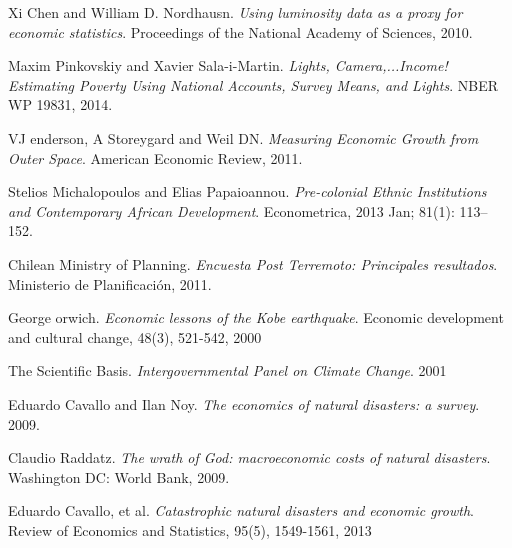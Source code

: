 \documentclass{beamer}
\begin{document}
\begin{thebibliography}{9}
	Xi Chen and William D. Nordhausn. 
	\textit{Using luminosity data as a proxy for economic statistics}. 
	Proceedings of the National Academy of Sciences, 2010.

	Maxim Pinkovskiy and Xavier Sala-i-Martin. 
	\textit{Lights, Camera,...Income! Estimating Poverty Using National Accounts, Survey Means, and Lights}. 
	NBER WP 19831, 2014.

	VJ enderson, A Storeygard and Weil DN. 
	\textit{Measuring Economic Growth from Outer Space}. 
	American Economic Review, 2011.

	Stelios Michalopoulos and Elias Papaioannou. 
	\textit{Pre-colonial Ethnic Institutions and Contemporary African Development}. 
	Econometrica, 2013 Jan; 81(1): 113–152.

	Chilean Ministry of Planning. 
	\textit{Encuesta Post Terremoto: Principales resultados}. 
	Ministerio de Planificación, 2011.
	
	George orwich.
	\textit{Economic lessons of the Kobe earthquake}. 
	Economic development and cultural change, 48(3), 521-542, 2000
	
	The Scientific Basis.
	\textit{Intergovernmental Panel on Climate Change}. 2001	
	
	Eduardo Cavallo and Ilan Noy. 
	\textit{The economics of natural disasters: a survey}. 2009.	
	
	Claudio Raddatz.
	\textit{The wrath of God: macroeconomic costs of natural disasters}. Washington DC: World Bank, 2009.
	
	Eduardo Cavallo, et al. \textit{Catastrophic natural disasters and economic growth}. Review of Economics and Statistics, 95(5), 1549-1561, 2013
	
\end{thebibliography}
\end{document}
